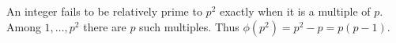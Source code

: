 An integer fails to be relatively prime to $p^2$ exactly when it is a multiple of $p$. Among $1,\ldots,p^2$ there are $p$ such multiples. Thus $\boxed{\phi(p^2)=p^2-p=p(p-1)}$.
